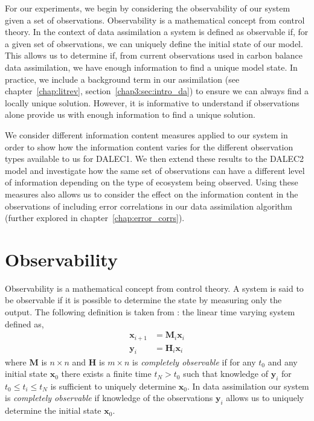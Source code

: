 For our experiments, we begin by considering the observability of our system given a set of observations. Observability is a mathematical concept from control theory. In the context of data assimilation a system is defined as observable if, for a given set of observations, we can uniquely define the initial state of our model. This allows us to determine if, from current observations used in carbon balance data assimilation, we have enough information to find a unique model state. In practice, we include a background term in our assimilation (see chapter~\ref{chap:litrev}, section~\ref{chap3:sec:intro_da}) to ensure we can always find a locally unique solution. However, it is informative to understand if observations alone provide us with enough information to find a unique solution.

We consider different information content measures applied to our system in order to show how the information content varies for the different observation types available to us for DALEC1. We then extend these results to the DALEC2 model and investigate how the same set of observations can have a different level of information depending on the type of ecosystem being observed. Using these measures also allows us to consider the effect on the information content in the observations of including error correlations in our data assimilation algorithm (further explored in chapter~\ref{chap:error_corrs}).

\section{Observability}

Observability is a mathematical concept from control theory. A system is said to be observable if it is possible to determine the state by measuring only the output. The following definition is taken from \citet{barnett1985introduction}: the linear time varying system defined as,
\begin{align}
\textbf{x}_{i+1} &= \textbf{M}_{i}\textbf{x}_{i} \\
\textbf{y}_{i} &= \textbf{H}_{i}\textbf{x}_{i}
\end{align}
where $\textbf{M}$ is $n \times n$ and $\textbf{H}$ is $m \times n$ is \textit{completely observable} if for any $t_0$ and any initial state $\textbf{x}_0$ there exists a finite time $t_N > t_0$ such that knowledge of $\textbf{y}_{i}$ for $t_0 \leq t_i \leq t_N$ is sufficient to uniquely determine $\textbf{x}_0$. In data assimilation our system is \textit{completely observable} if knowledge of the observations $\textbf{y}_{i}$ allows us to uniquely determine the initial state $\textbf{x}_0$.

